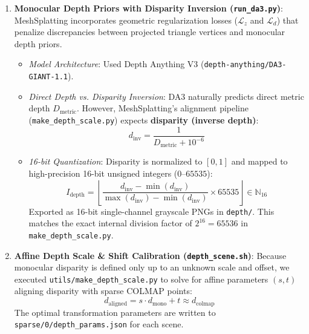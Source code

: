 \begin{enumerate}[leftmargin=*]
    \item \textbf{Monocular Depth Priors with Disparity Inversion (\texttt{run\_da3.py})}:
    MeshSplatting incorporates geometric regularization losses ($\mathcal{L}_z$ and $\mathcal{L}_d$) that penalize discrepancies between projected triangle vertices and monocular depth priors.
    \begin{itemize}
        \item \textit{Model Architecture}: Used Depth Anything V3 (\texttt{depth-anything/DA3-GIANT-1.1}).
        \item \textit{Direct Depth vs. Disparity Inversion}: DA3 naturally predicts direct metric depth $D_{\text{metric}}$. However, MeshSplatting's alignment pipeline (\texttt{make\_depth\_scale.py}) expects \textbf{disparity (inverse depth)}:
        \begin{equation}
            d_{\text{inv}} = \frac{1}{D_{\text{metric}} + 10^{-6}}
        \end{equation}
        \item \textit{16-bit Quantization}: Disparity is normalized to $[0, 1]$ and mapped to high-precision 16-bit unsigned integers ($0$--$65535$):
        \begin{equation}
            I_{\text{depth}} = \left\lfloor \frac{d_{\text{inv}} - \min(d_{\text{inv}})}{\max(d_{\text{inv}}) - \min(d_{\text{inv}})} \times 65535 \right\rfloor \in \mathbb{N}_{16}
        \end{equation}
        Exported as 16-bit single-channel grayscale PNGs in \texttt{depth/}. This matches the exact internal division factor of $2^{16} = 65536$ in \texttt{make\_depth\_scale.py}.
    \end{itemize}

    \item \textbf{Affine Depth Scale \& Shift Calibration (\texttt{depth\_scene.sh})}:
    Because monocular disparity is defined only up to an unknown scale and offset, we executed \texttt{utils/make\_depth\_scale.py} to solve for affine parameters $(s, t)$ aligning disparity with sparse COLMAP points:
    \begin{equation}
        d_{\text{aligned}} = s \cdot d_{\text{mono}} + t \approx d_{\text{colmap}}
    \end{equation}
    The optimal transformation parameters are written to \texttt{sparse/0/depth\_params.json} for each scene.


\end{enumerate}
